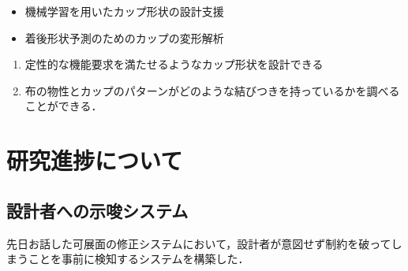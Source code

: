 \documentclass[11pt]{jsarticle}
\begin{document}
	\articleSPRabst
		\begin{itemize}
			\item 機械学習を用いたカップ形状の設計支援
			\item 着後形状予測のためのカップの変形解析
		\end{itemize}
		
		
	\articleSPRobj
		\begin{enumerate}
			\item 定性的な機能要求を満たせるようなカップ形状を設計できる
			\item 布の物性とカップのパターンがどのような結びつきを持っているかを調べることができる．
		\end{enumerate}
	\articleSPRitemsone
		
		\tableofcontents
		
		
	\articleSPRitemstwo
	\renewcommand{\labelitemi}{$\blacktriangledown$}
	\newcommand{\argmax}{\mathop{\rm arg~max}\limits}
	\newcommand{\argmin}{\mathop{\rm arg~min}\limits}
	\newcommand{\Ker}{{\rm Ker}}
	\newcommand{\rank}{{\rm rank}}
	\section{研究進捗について}
		\subsection{設計者への示唆システム}	
			先日お話した可展面の修正システムにおいて，設計者が意図せず制約を破ってしまうことを事前に検知するシステムを構築した．
			
\end{document}

